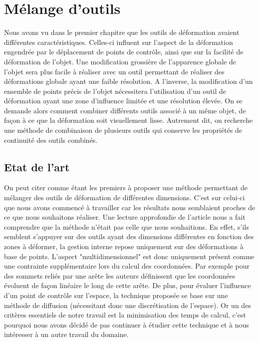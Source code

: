 

\chapter{Mélange d'outils}

\graphicspath{ {Chapter3/Chapter3Figs/PNG/}
  {Chapter3/Chapter3Figs/PDF/} {Chapter3/Chapter3Figs/} }

Nous avons vu dans le premier chapitre que les outils de déformation avaient
différentes caractéristiques. Celles-ci influent sur l'aspect de la
déformation engendrée par le déplacement de points de contrôle, ainsi que sur
la facilité de déformation de l'objet. Une modification grossière de
l'apparence globale de l'objet sera plus facile à réaliser avec un outil
permettant de réaliser des déformations globale ayant une faible résolution. A
l'inverse, la modification d'un ensemble de points précis de l'objet
nécessitera l'utilisation d'un outil de déformation ayant une zone d'influence
limitée et une résolution élevée. On se demande alors comment combiner
différents outils associé à un même objet, de façon à ce que la déformation
soit visuellement lisse. Autrement dit, on recherche une méthode de
combinaison de plusieurs outils qui conserve les propriétés de continuité des
outils combinés.

\section{Etat de l'art}

On peut citer \cite{JBPS11} comme étant les premiers à proposer une méthode
permettant de mélanger des outils de déformation de différentes dimensions.
C'est sur celui-ci que nous avons commencé à travailler car les résultats nous
semblaient proches de ce que nous souhaitons réaliser. Une lecture approfondie
de l'article nous a fait comprendre que la méthode n'était pas celle que nous
souhaitions. En effet, s'ils semblent s'appuyer sur des outils ayant des
dimensions différentes en fonction des zones à déformer, la gestion interne
repose uniquement sur des déformations à base de points. L'aspect
"multidimensionnel" est donc uniquement présent comme une contrainte
supplémentaire lors du calcul des coordonnées. Par exemple pour des sommets
reliés par une arête les auteurs définissent que les coordonnées évoluent de
façon linéaire le long de cette arête. De plus, pour évaluer l'influence d'un
point de contrôle sur l'espace, la technique proposée se base sur une méthode
de diffusion (nécessitant donc une discrétisation de l'espace). Or un des
critères essentiels de notre travail est la minimisation des temps de calcul,
c'est pourquoi nous avons décidé de pas continuer à étudier cette technique et
à nous intéresser à un autre travail du domaine.

